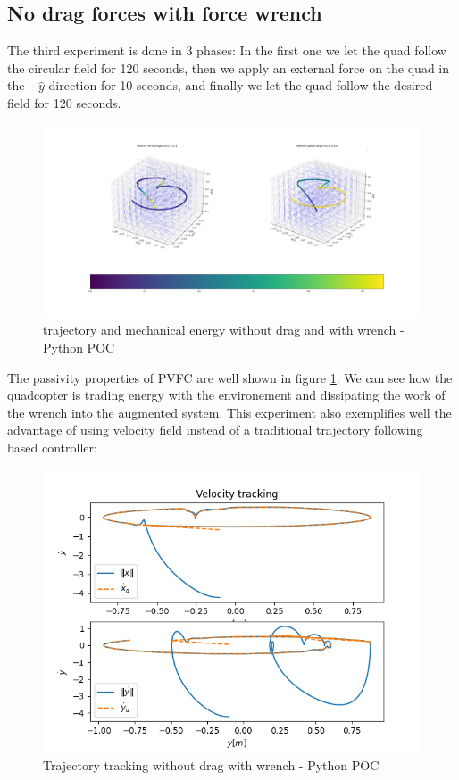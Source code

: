 \subsection{No drag forces with force wrench}
The third experiment is done in 3 phases: In the first one we let the quad follow the circular field for 120 seconds, 
then we apply an external force on the quad in the $-\hat{y}$ direction for 10 seconds,
and finally we let the quad follow the desired field for 120 seconds.
\begin{figure}[h!]
   \centering
   \includegraphics[width=\linewidth]{Images/python-nodrag-wrench.png}
   \caption{trajectory and mechanical energy without drag and with wrench - Python POC }
   \label{fig:pythonnodragwrench}
\end{figure}
The passivity properties of PVFC are well shown in figure \ref{fig:pythonnodragwrench}. We can see how the quadcopter is trading energy with the environement and dissipating the work of the wrench into the augmented system.
This experiment also exemplifies well the advantage of using velocity field instead of a traditional trajectory following based controller:
\begin{figure}[h!]
   \centering
   \includegraphics[width=\linewidth]{Images/velocitytrackingpythonnodragwrench.png}
   \caption{Trajectory tracking without drag with wrench - Python POC }
   \label{fig:trajtracknodragwrench}
\end{figure}
